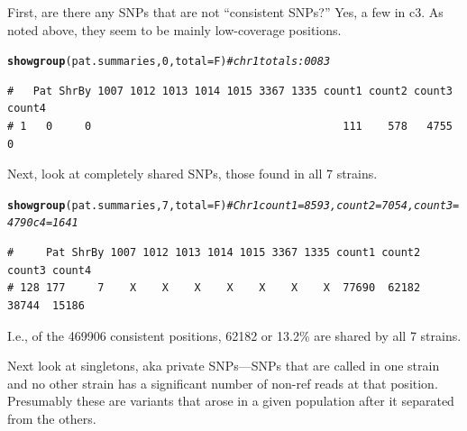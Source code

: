 \documentclass{article}\usepackage[]{graphicx}\usepackage[]{color}
\makeatletter
\newcommand{\hlnum}[1]{\textcolor[rgb]{0.686,0.059,0.569}{#1}}%
\newcommand{\hlcom}[1]{\textcolor[rgb]{0.678,0.584,0.686}{\textit{#1}}}%
\newcommand{\hlstd}[1]{\textcolor[rgb]{0.345,0.345,0.345}{#1}}%
\newcommand{\hlkwc}[1]{\textcolor[rgb]{0.333,0.667,0.333}{#1}}%
\newcommand{\hlkwd}[1]{\textcolor[rgb]{0.737,0.353,0.396}{\textbf{#1}}}%
\newenvironment{kframe}{%
 \def\at@end@of@kframe{}%
 \ifinner\ifhmode%
  \def\at@end@of@kframe{\end{minipage}}%
  \begin{minipage}{\columnwidth}%
 \fi\fi%
 \def\FrameCommand##1{\hskip\@totalleftmargin \hskip-\fboxsep
 \colorbox{shadecolor}{##1}\hskip-\fboxsep
     \hskip-\linewidth \hskip-\@totalleftmargin \hskip\columnwidth}%
 \MakeFramed {\advance\hsize-\width
   \@totalleftmargin\z@ \linewidth\hsize
   \@setminipage}}%
 {\par\unskip\endMakeFramed%
 \at@end@of@kframe}
\newenvironment{knitrout}{}{} %
\makeatother
\begin{document}
First, are there any SNPs that are not ``consistent SNPs?''  Yes, a few in c3.  As noted above, they seem to be mainly
low-coverage positions.

\begin{knitrout}\footnotesize
{}\color{fgcolor}\begin{kframe}
\begin{alltt}
\hlkwd{showgroup}\hlstd{(pat.summaries,}\hlnum{0}\hlstd{,}\hlkwc{total}\hlstd{=F)}  \hlcom{# chr1 totals: 0 0 83}
\end{alltt}
\begin{verbatim}
#   Pat ShrBy 1007 1012 1013 1014 1015 3367 1335 count1 count2 count3 count4
# 1   0     0                                       111    578   4755      0
\end{verbatim}
\end{kframe}
\end{knitrout}

Next, look at completely shared SNPs, those found in all 7 strains.

\begin{knitrout}\footnotesize
{}\color{fgcolor}\begin{kframe}
\begin{alltt}
\hlkwd{showgroup}\hlstd{(pat.summaries,}\hlnum{7}\hlstd{,}\hlkwc{total}\hlstd{=F)} \hlcom{# Chr1 count1 = 8593, count2 = 7054, count3 = 4790 c4=1641}
\end{alltt}
\begin{verbatim}
#     Pat ShrBy 1007 1012 1013 1014 1015 3367 1335 count1 count2 count3 count4
# 128 177     7    X    X    X    X    X    X    X  77690  62182  38744  15186
\end{verbatim}
\end{kframe}
\end{knitrout}

I.e., of the
  469906
consistent positions,
  62182
or
  13.2\%
are shared by all 7 strains.

Next look at singletons, aka private SNPs---SNPs that are called in one strain and no other strain has a significant
number of non-ref reads at that position. Presumably these are variants that arose in a given population after it
separated from the others.
\end{document}
